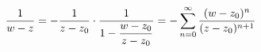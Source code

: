 \documentclass[preview]{standalone}
\begin{document}
\begin{align*}
\special{dvisvgm:raw <g id='unique000'>}\frac{1}{w-z} = -\frac{1}{z-z_0}\cdot\frac{1}{1-\dfrac{w-z_0}{z-z_0}}= -\sum_{n=0}^{\infty} \frac{(w-z_0)^n}{(z-z_0)^{n+1}}\special{dvisvgm:raw </g>}
\end{align*}
\end{document}

